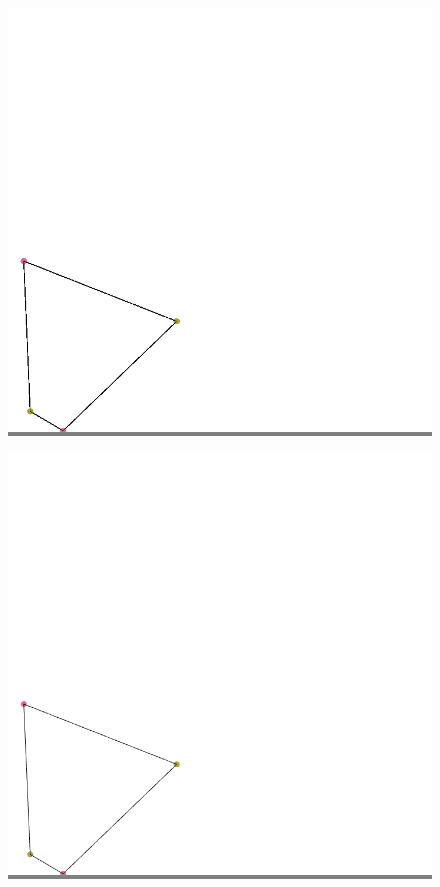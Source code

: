 \documentclass{article}
\begin{document}
\begin{figure}
\begin{minipage}{0.3\textwidth}
            \end{minipage}
            \vskip 0.1in
            \begin{center}
                \begin{minipage}{0.3\textwidth}
                \colorbox{gray}{\includegraphics[width=\linewidth]{./images/no-bridge-wt.png}}
                \end{minipage}
                \hskip 0.3in
                \begin{minipage}{0.3\textwidth}
                \colorbox{gray}{\includegraphics[width=\linewidth]{./images/backbone-wt.png}}
                \end{minipage}
            \end{center}


\end{figure}
\end{document}
